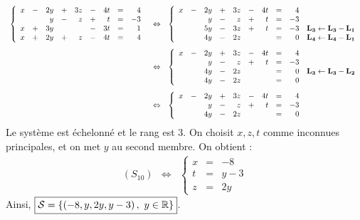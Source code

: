 \documentclass[a4paper, 11pt,reqno]{article}
\begin{document}
\begin{correction}
\begin{enumerate}
$$\begin{array}{rcl}
\left\lbrace\begin{array}{rcrcrcrcr}
x & - &2y & + &3z & - &4t & =& 4\\
 & & y & - & z & + &t & = & -3\\
x & + &3y & & &- &3t & = & 1\\
x & + &2y & + &z & -& 4t & = & 4
\end{array}\right.
& \Leftrightarrow &
\left\lbrace\begin{array}{rcrcrcrcrl}
x & - &2y & + &3z & - &4t & =& 4\\
 & & y & - & z & + &t & = & -3\\
 &  &5y & -& 3z &+&t & = & -3&\mathbf{L_3 \leftarrow L_3-L_1}\\
 &  &4y & - &2z & &  & = & 0&\mathbf{L_4 \leftarrow L_4-L_1}
\end{array}\right.\vsec\\
& \Leftrightarrow &
\left\lbrace\begin{array}{rcrcrcrcrl}
x & - &2y & + &3z & - &4t & =& 4\\
 & & y & - & z & + &t & = & -3\\
 &  &4y & -& 2z && & = & 0&\mathbf{L_3 \leftarrow L_3-L_2}\\
 &  &4y & - &2z & &  & = & 0
\end{array}\right.\vsec\\
& \Leftrightarrow &
\left\lbrace\begin{array}{rcrcrcrcrl}
x & - &2y & + &3z & - &4t & =& 4\\
 & & y & - & z & + &t & = & -3\\
 &  &4y & -& 2z && & = & 0
\end{array}\right.
\end{array}$$
Le syst\`eme est \'echelonn\'e et le rang est 3. On choisit $x,z,t$ comme inconnues principales, et on met $y$ au second membre. On obtient :
$$\begin{array}{rcl}
(S_{10})
& \Leftrightarrow &
\left\lbrace\begin{array}{rcrcrcrcrl}
x &  =& -8\\
t & = & y-3\\
z & = & 2y
\end{array}\right.
\end{array}$$
Ainsi, $\fbox{$ \mathcal{S}=\left\lbrace  \left(-8,y,2y,y-3   \right),\ y\in\mathbb{R} \right\rbrace $}$.
\end{enumerate}
\end{correction}
\end{document}
